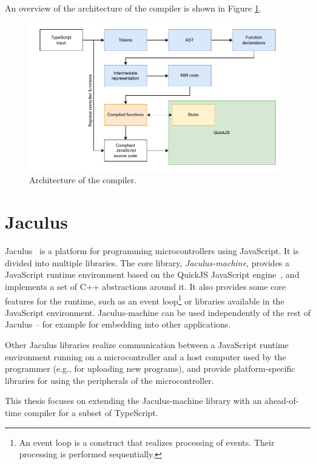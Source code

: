 An overview of the architecture of the compiler is shown in Figure \ref{fig:architecture}.

\begin{figure}
    \centering
    \includegraphics[width=\textwidth, draft=false]{assets/img/architecture.pdf}
    \caption{Architecture of the compiler.}
    \label{fig:architecture}
\end{figure}


\section{Jaculus}\label{jaculus}

Jaculus~\cite{jaculusthesis} is a platform for programming microcontrollers using JavaScript. It is divided into multiple libraries. The core library, \textit{Jaculus-machine}, provides a JavaScript runtime environment based on the QuickJS JavaScript engine~\cite{quickjs}, and implements a set of C++ abstractions around it. It also provides some core features for the runtime, such as an event loop\footnote{An event loop is a construct that realizes processing of events. Their processing is performed sequentially.} or libraries available in the JavaScript environment. Jaculus-machine can be used independently of the rest of Jaculus -- for example for embedding into other applications.

Other Jaculus libraries realize communication between a JavaScript runtime environment running on a microcontroller and a host computer used by the programmer (e.g., for uploading new programs), and provide platform-specific libraries for using the peripherals of the microcontroller.

This thesis focuses on extending the Jaculus-machine library with an ahead-of-time compiler for a subset of TypeScript.


